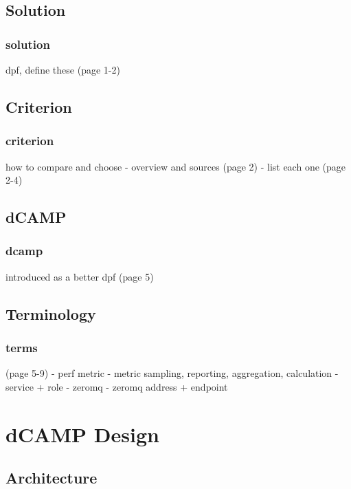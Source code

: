 \subsection{Solution}
\begin{frame}
\frametitle{solution}
dpf, define these (page 1-2)
\end{frame}

\subsection{Criterion}
\begin{frame}
\frametitle{criterion}
how to compare and choose
-   overview and sources (page 2)
-   list each one (page 2-4)
\end{frame}

\subsection{dCAMP}
\begin{frame}
\frametitle{dcamp}
introduced as a better dpf (page 5)
\end{frame}

\subsection{Terminology}
\begin{frame}
\frametitle{terms}
(page 5-9)
-   perf metric
-   metric sampling, reporting, aggregation, calculation
-   service + role
-   zeromq
-   zeromq address + endpoint
\end{frame}

\section{dCAMP Design}

\subsection{Architecture}

